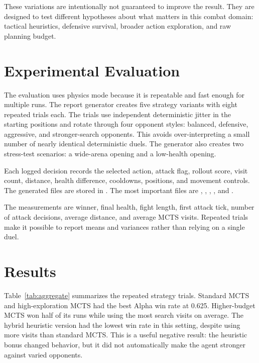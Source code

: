 \documentclass[11pt]{article}
\begin{document}
These variations are intentionally not guaranteed to improve the result. They are designed to test different hypotheses about what matters in this combat domain: tactical heuristics, defensive survival, broader action exploration, and raw planning budget.

\section{Experimental Evaluation}

The evaluation uses physics mode because it is repeatable and fast enough for multiple runs. The report generator creates five strategy variants with eight repeated trials each. The trials use independent deterministic jitter in the starting positions and rotate through four opponent styles: balanced, defensive, aggressive, and stronger-search opponents. This avoids over-interpreting a small number of nearly identical deterministic duels. The generator also creates two stress-test scenarios: a wide-arena opening and a low-health opening.

Each logged decision records the selected action, attack flag, rollout score, visit count, distance, health difference, cooldowns, positions, and movement controls. The generated files are stored in . The most important files are , , , , and .

The measurements are winner, final health, fight length, first attack tick, number of attack decisions, average distance, and average MCTS visits. Repeated trials make it possible to report means and variances rather than relying on a single duel.

\section{Results}

Table~\ref{tab:aggregate} summarizes the repeated strategy trials. Standard MCTS and high-exploration MCTS had the best Alpha win rate at 0.625. Higher-budget MCTS won half of its runs while using the most search visits on average. The hybrid heuristic version had the lowest win rate in this setting, despite using more visits than standard MCTS. This is a useful negative result: the heuristic bonus changed behavior, but it did not automatically make the agent stronger against varied opponents.
\end{document}
